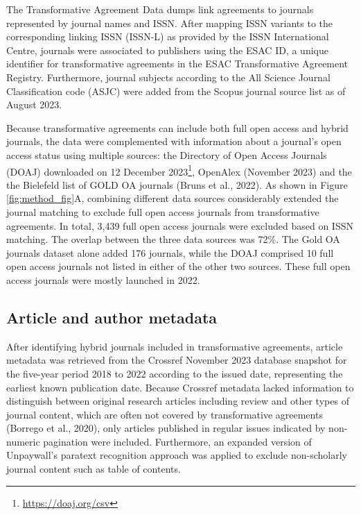 \documentclass[a4paper,man,floatsintext,longtable,noextraspace,12pt]{apa6}
\begin{document}
The Transformative Agreement Data dumps link agreements to journals
represented by journal names and ISSN. After mapping ISSN variants to
the corresponding linking ISSN (ISSN-L) as provided by the ISSN
International Centre, journals were associated to publishers using the
ESAC ID, a unique identifier for transformative agreements in the ESAC
Transformative Agreement Registry. Furthermore, journal subjects
according to the All Science Journal Classification code (ASJC) were
added from the Scopus journal source list as of August 2023.

Because transformative agreements can include both full open access and
hybrid journals, the data were complemented with information about a
journal's open access status using multiple sources: the Directory of
Open Access Journals (DOAJ) downloaded on 12 December 2023\footnote{\url{https://doaj.org/csv}},
OpenAlex (November 2023) and the the Bielefeld list of GOLD OA journals
(Bruns et al., 2022). As shown in Figure \ref{fig:method_fig}A,
combining different data sources considerably extended the journal
matching to exclude full open access journals from transformative
agreements. In total, 3,439 full open access journals were excluded
based on ISSN matching. The overlap between the three data sources was
72\%. The Gold OA journals dataset alone added 176 journals, while the
DOAJ comprised 10 full open access journals not listed in either of the
other two sources. These full open access journals were mostly launched
in 2022.

\hypertarget{article-and-author-metadata}{%
\subsection{Article and author
metadata}\label{article-and-author-metadata}}

After identifying hybrid journals included in transformative agreements,
article metadata was retrieved from the Crossref November 2023 database
snapshot for the five-year period 2018 to 2022 according to the issued
date, representing the earliest known publication date. Because Crossref
metadata lacked information to distinguish between original research
articles including review and other types of journal content, which are
often not covered by transformative agreements (Borrego et al., 2020),
only articles published in regular issues indicated by non-numeric
pagination were included. Furthermore, an expanded version of
Unpaywall's paratext recognition approach was applied to exclude
non-scholarly journal content such as table of contents.
\end{document}
